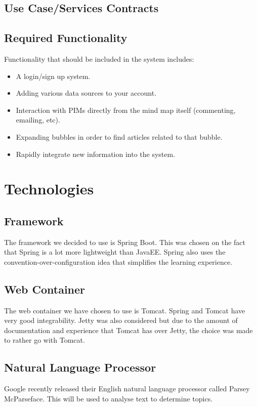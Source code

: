 \documentclass[hidelinks,english]{article}
\begin{document}
		\subsection{Use Case/Services Contracts}
		
		\subsection{Required Functionality}
			Functionality that should be included in the system includes:
			\begin{itemize}
			\item A login/sign up system. 
			\item Adding various data sources to your account.
			\item Interaction with PIMs directly from the mind map itself (commenting, emailing, etc).
			\item Expanding bubbles in order to find articles related to that bubble.
			\item Rapidly integrate new information into the system.
			\end{itemize}
			
	\section{Technologies}
		\subsection{Framework}
			The framework we decided to use is Spring Boot. This was chosen on the fact that Spring is a lot more lightweight than JavaEE. Spring also uses the convention-over-configuration idea that simplifies the learning experience.
			
		\subsection{Web Container}
			The web container we have chosen to use is Tomcat. Spring and Tomcat have very good integrability. Jetty was also considered but due to the amount of documentation and experience that Tomcat has over Jetty, the choice was made to rather go with Tomcat.
		
		\subsection{Natural Language Processor}
			Google recently released their English natural language processor called Parsey McParseface. This will be used to analyse text to determine topics.
			
\end{document}
